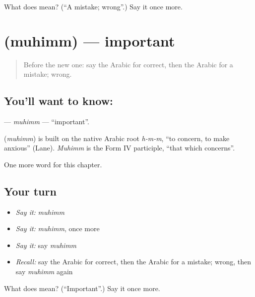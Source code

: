 \begin{tcolorbox}[breakable,colback=teal!4,colframe=teal!35!black,title={Before you move on}]
What does  mean? (\textquotedblleft{}A mistake; wrong\textquotedblright{}.) Say it once more.
\end{tcolorbox}
\section[\texorpdfstring{\ar{مهم} (muhimm)}{مهم (muhimm)}]{ (muhimm) — important}

\label{lesson:AR-C85-muhimm}



\begin{quote}
Before the new one: say the Arabic for correct, then the Arabic for a mistake; wrong.
\end{quote}

\subsection*{You'll want to know: }
\textbf{} — \emph{muhimm} — \textquotedblleft{}important\textquotedblright{}.

\begin{cousinweb}
\textbf{} (\emph{muhimm}) is built on the native Arabic root \emph{h-m-m}, \textquotedblleft{}to concern, to make anxious\textquotedblright{} (Lane). \emph{Muhimm} is the Form IV participle, \textquotedblleft{}that which concerns\textquotedblright{}.
\end{cousinweb}

\begin{grammarlens}[title={What you've built}]
One more word for this chapter.
\end{grammarlens}

\subsection*{Your turn}
\begin{itemize}
\raggedright
  \item \emph{Say it:} \emph{muhimm}
  \item \emph{Say it:} \emph{muhimm}, once more
  \item \emph{Say it:} say \emph{muhimm}
  \item \emph{Recall:} say the Arabic for correct, then the Arabic for a mistake; wrong, then say \emph{muhimm} again
\end{itemize}

\begin{tcolorbox}[breakable,colback=teal!4,colframe=teal!35!black,title={Before you move on}]
What does  mean? (\textquotedblleft{}Important\textquotedblright{}.) Say it once more.
\end{tcolorbox}
